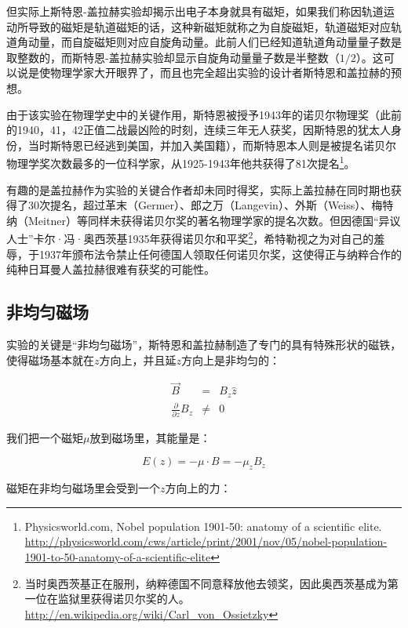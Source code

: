 但实际上斯特恩-盖拉赫实验却揭示出电子本身就具有磁矩，如果我们称因轨道运动所导致的磁矩是轨道磁矩的话，这种新磁矩就称之为自旋磁矩，轨道磁矩对应轨道角动量，而自旋磁矩则对应自旋角动量。此前人们已经知道轨道角动量量子数是取整数的，而斯特恩-盖拉赫实验却显示自旋角动量量子数是半整数（$1/2$）。这可以说是使物理学家大开眼界了，而且也完全超出实验的设计者斯特恩和盖拉赫的预想。

由于该实验在物理学史中的关键作用，斯特恩被授予1943年的诺贝尔物理奖（此前的1940，41，42正值二战最凶险的时刻，连续三年无人获奖，因斯特恩的犹太人身份，当时斯特恩已经逃到美国，并加入美国籍），而斯特恩本人则是被提名诺贝尔物理学奖次数最多的一位科学家，从1925-1943年他共获得了81次提名\footnote{Physicsworld.com, Nobel population 1901-50: anatomy of a scientific elite. \url{http://physicsworld.com/cws/article/print/2001/nov/05/nobel-population-1901-to-50-anatomy-of-a-scientific-elite}}。

有趣的是盖拉赫作为实验的关键合作者却未同时得奖，实际上盖拉赫在同时期也获得了30次提名，超过革末（Germer）、郎之万（Langevin）、外斯（Weiss）、梅特纳（Meitner）等同样未获得诺贝尔奖的著名物理学家的提名次数。但因德国“异议人士”卡尔·冯·奥西茨基1935年获得诺贝尔和平奖\footnote{当时奥西茨基正在服刑，纳粹德国不同意释放他去领奖，因此奥西茨基成为第一位在监狱里获得诺贝尔奖的人。\url{http://en.wikipedia.org/wiki/Carl_von_Ossietzky}}，希特勒视之为对自己的羞辱，于1937年颁布法令禁止任何德国人领取任何诺贝尔奖，这使得正与纳粹合作的纯种日耳曼人盖拉赫很难有获奖的可能性。

\subsection{非均匀磁场}

实验的关键是“非均匀磁场”，斯特恩和盖拉赫制造了专门的具有特殊形状的磁铁，使得磁场基本就在$z$方向上，并且延$z$方向上是非均匀的：

\begin{eqnarray}
\vec B & =  & B_z \hat z \\
\frac{\partial }{\partial z} B_z & \neq & 0
\end{eqnarray}

我们把一个磁矩$\mu$放到磁场里，其能量是：

\begin{equation}
E(z) = - \mu \cdot B = - \mu_z B_z  
\end{equation}

磁矩在非均匀磁场里会受到一个$z$方向上的力：

